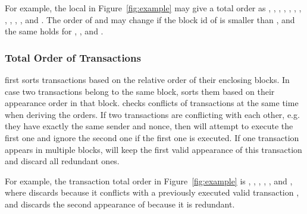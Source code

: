For example,  the local \tg in Figure~\ref{fig:example} may give a total order as
, , , , , , , , ,  , , and .
The order of   and   may change if the block id of   is smaller than  , 
and the same holds for  , , and  .



\subsubsection{Total Order of Transactions}
\label{sec:txorder}
{\name} first sorts transactions based on the relative order of their enclosing blocks.
In case two transactions belong to the same block, {\name} sorts them based on their appearance order in that block.
{\name} checks conflicts of transactions at the same time when deriving
the orders. If two transactions are conflicting with each other, 
e.g. they have exactly the same sender and nonce, 
then {\name} will attempt to execute the first one and 
ignore the second one if the first one is executed. 
If one transaction appears in multiple blocks, {\name}
will keep the first valid appearance of this transaction and discard all redundant ones.

For example, the transaction total order in Figure~\ref{fig:example} is ,
, , , , and ,
where {\name} discards  because it conflicts with
a previously executed valid transaction , and discards the second appearance of  because it is redundant.





